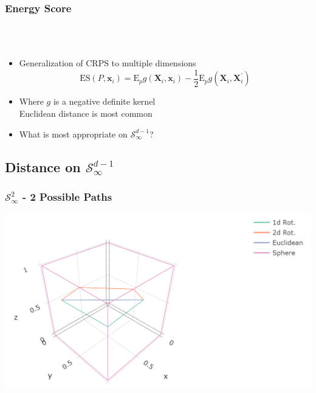 \documentclass[aspectratio=169]{beamer}
\begin{document}
\begin{frame}
  \frametitle{Energy Score}
  {\scriptsize \citep{gneiting2007}}\\~\vspace{0.2cm}\\
  \begin{itemize}
    \item Generalization of CRPS to multiple dimensions
    \begin{equation*}
      \label{eq:es}
      \text{ES}\left(P,\bm{x}_i\right) =  \text{E}_p g\left(\bm{X}_i, \bm{x}_i\right)
                - \frac{1}{2}\text{E}_p g\left(\bm{X}_i,\bm{X}_i^{\prime}\right)
    \end{equation*}
    \pause
    \item Where $g$ is a negative definite kernel\\
      Euclidean distance is most common
    \pause
    \item What is most appropriate on $\mathcal{S}_{\infty}^{d-1}$?
  \end{itemize}
\end{frame}

\subsection{Distance on $\mathcal{S}_{\infty}^{d-1}$}
\begin{frame}
  \frametitle{$\mathcal{S}_{\infty}^{2}$ - 2 Possible Paths}
  \begin{center}
    \includegraphics[width=0.8\linewidth]{./images/rotation}
  \end{center}
\end{frame}
\end{document}

